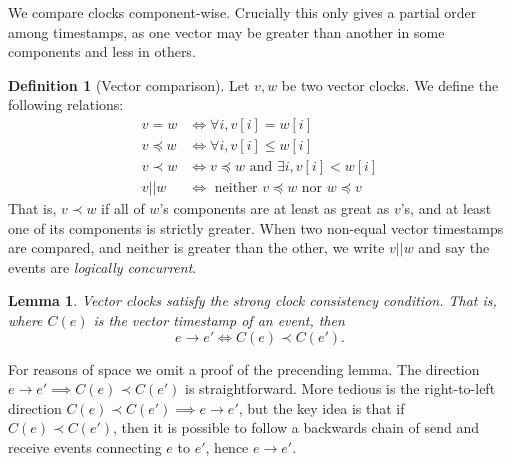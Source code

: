 \documentclass[]             %
{NASA}                       %
\newtheorem{lemma}[theorem]{Lemma}
\theoremstyle{definition}
\newtheorem{definition}{Definition}[section]
\begin{document}
\afterpage{\clearpage}

We compare clocks component-wise. Crucially this only gives a partial
order among timestamps, as one vector may be greater than another in
some components and less in others.

\begin{definition}[Vector comparison]
  Let $v, w$ be two vector clocks. We define the following relations:
  \begin{align*}
             v = w &\iff \forall i, v[i] = w[i] \\
  v \preccurlyeq w &\iff \forall i, v[i] \leq w[i] \\
         v \prec w &\iff v \preccurlyeq w \textrm{ and } \exists i, v[i] < w[i] \\
            v || w &\iff \textrm{ neither } v \preccurlyeq w \textrm{ nor } w \preccurlyeq v
  \end{align*}
  That is, $v \prec w$ if all of $w$'s components are at least as
  great as $v$'s, and at least one of its components is strictly
  greater. When two non-equal vector timestamps are compared, and
  neither is greater than the other, we write $v || w$ and say the
  events are \emph{logically concurrent}. 
\end{definition}

\begin{lemma}
  Vector clocks satisfy the strong clock consistency condition. That
  is, where $C(e)$ is the vector timestamp of an event, then
  \[ e \to e' \iff C(e) \prec C(e'). \]
\end{lemma}

For reasons of space we omit a proof of the precending lemma.  The
direction $e \to e' \implies C(e) \prec C(e')$ is
straightforward. More tedious is the right-to-left direction
$C(e) \prec C(e') \implies e \to e'$, but the key idea is that if
$C(e) \prec C(e')$, then it is possible to follow a backwards chain of
send and receive events connecting $e$ to $e'$, hence $e \to e'$.


\end{document}
